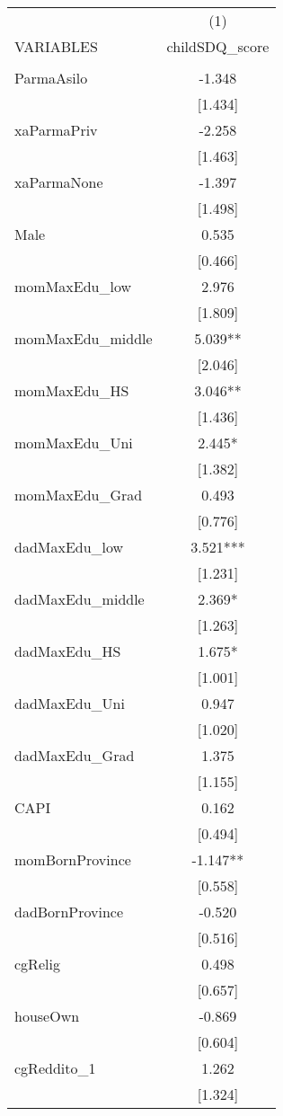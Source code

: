 \documentclass[]{article}
\begin{document}
\begin{tabular}{lc} \hline
 & (1) \\
VARIABLES & childSDQ\_score \\ \hline
 &  \\
ParmaAsilo & -1.348 \\
 & [1.434] \\
xaParmaPriv & -2.258 \\
 & [1.463] \\
xaParmaNone & -1.397 \\
 & [1.498] \\
Male & 0.535 \\
 & [0.466] \\
momMaxEdu\_low & 2.976 \\
 & [1.809] \\
momMaxEdu\_middle & 5.039** \\
 & [2.046] \\
momMaxEdu\_HS & 3.046** \\
 & [1.436] \\
momMaxEdu\_Uni & 2.445* \\
 & [1.382] \\
momMaxEdu\_Grad & 0.493 \\
 & [0.776] \\
dadMaxEdu\_low & 3.521*** \\
 & [1.231] \\
dadMaxEdu\_middle & 2.369* \\
 & [1.263] \\
dadMaxEdu\_HS & 1.675* \\
 & [1.001] \\
dadMaxEdu\_Uni & 0.947 \\
 & [1.020] \\
dadMaxEdu\_Grad & 1.375 \\
 & [1.155] \\
CAPI & 0.162 \\
 & [0.494] \\
momBornProvince & -1.147** \\
 & [0.558] \\
dadBornProvince & -0.520 \\
 & [0.516] \\
cgRelig & 0.498 \\
 & [0.657] \\
houseOwn & -0.869 \\
 & [0.604] \\
cgReddito\_1 & 1.262 \\
 & [1.324] \\

\end{tabular}
\end{document}
